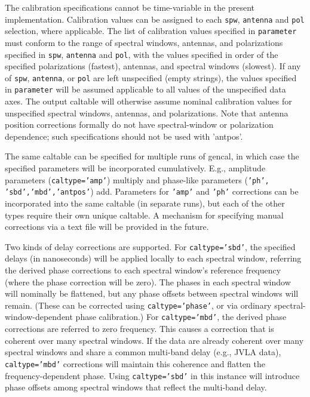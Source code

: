 The calibration specifications cannot be time-variable in the present
implementation.  Calibration values can be assigned to each {\tt spw},
{\tt antenna} and {\tt pol} selection, where applicable.  The list 
of calibration values specified in {\tt parameter} must conform to
the range of spectral windows, antennas, and polarizations specified
in {\tt spw}, {\tt antenna} and {\tt pol}, with the values specified
in order of the specified polarizations (fastest), antennas, and spectral
windows (slowest).  If any of {\tt spw}, 
{\tt antenna}, or {\tt pol} are left unspecified (empty strings), the
values specified in {\tt parameter} will be assumed applicable to
all values of the unspecified data axes. The output caltable will
otherwise assume nominal calibration values for unspecified spectral
windows, antennas, and polarizations.  Note that antenna position
corrections formally do not have spectral-window or polarization
dependence; such specifications should not be used with 'antpos'.

The same caltable can be specified for multiple runs of gencal, in
which case the specified parameters will be incorporated cumulatively.
E.g., amplitude parameters ({\tt caltype='amp'}) multiply and
phase-like parameters ({\tt 'ph', 'sbd','mbd','antpos'}) add.
Parameters for {\tt 'amp'} and {\tt 'ph'} corrections can be
incorporated into the same caltable (in separate runs), but each of
the other types require their own unique caltable.  A mechanism for
specifying manual corrections via a text file will be provided in the
future.

Two kinds of delay corrections are supported.  For {\tt caltype='sbd'},
the specified delays (in nanoseconds) will be applied locally to 
each spectral window, referring the derived phase corrections to
each spectral window's reference frequency (where the phase correction
will be zero).  The phases in each spectral window will nominally be
flattened, but any phase offsets between spectral windows will remain.
(These can be corrected using {\tt caltype='phase'}, or via ordinary
spectral-window-dependent phase calibration.)  For {\tt caltype='mbd'},
the derived phase corrections are referred to zero frequency.  This
causes a correction that is coherent over many spectral windows. 
If the data are already coherent over many spectral windows and share
a common multi-band delay (e.g., JVLA data), {\tt caltype='mbd'} 
corrections will maintain this coherence and flatten the 
frequency-dependent phase.  Using {\tt caltype='sbd'} in this instance
will introduce phase offsets among spectral windows that reflect
the multi-band delay.  


